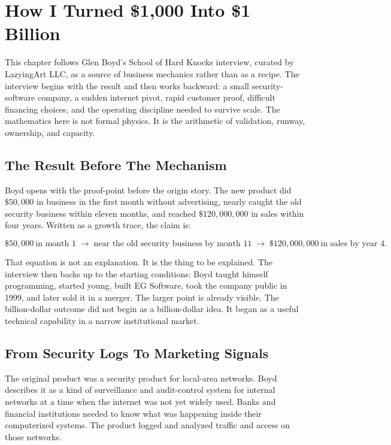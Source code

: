 \chapter{How I Turned \$1,000 Into \$1 Billion}

This chapter follows Glen Boyd's School of Hard Knocks interview, curated by LazyingArt LLC, as a source of business mechanics rather than as a recipe. The interview begins with the result and then works backward: a small security-software company, a sudden internet pivot, rapid customer proof, difficult financing choices, and the operating discipline needed to survive scale. The mathematics here is not formal physics. It is the arithmetic of validation, runway, ownership, and capacity.

\section{The Result Before The Mechanism}

Boyd opens with the proof-point before the origin story. The new product did \(\$50{,}000\) in business in the first month without advertising, nearly caught the old security business within eleven months, and reached \(\$120{,}000{,}000\) in sales within four years. Written as a growth trace, the claim is:

\begin{equation}
\$50{,}000\ \text{in month 1}
\;\longrightarrow\;
\text{near the old security business by month 11}
\;\longrightarrow\;
\$120{,}000{,}000\ \text{in sales by year 4}.
\end{equation}

That equation is not an explanation. It is the thing to be explained. The interview then backs up to the starting conditions: Boyd taught himself programming, started young, built EG Software, took the company public in 1999, and later sold it in a merger. The larger point is already visible. The billion-dollar outcome did not begin as a billion-dollar idea. It began as a useful technical capability in a narrow institutional market.

\section{From Security Logs To Marketing Signals}

The original product was a security product for local-area networks. Boyd describes it as a kind of surveillance and audit-control system for internal networks at a time when the internet was not yet widely used. Banks and financial institutions needed to know what was happening inside their computerized systems. The product logged and analyzed traffic and access on those networks.

